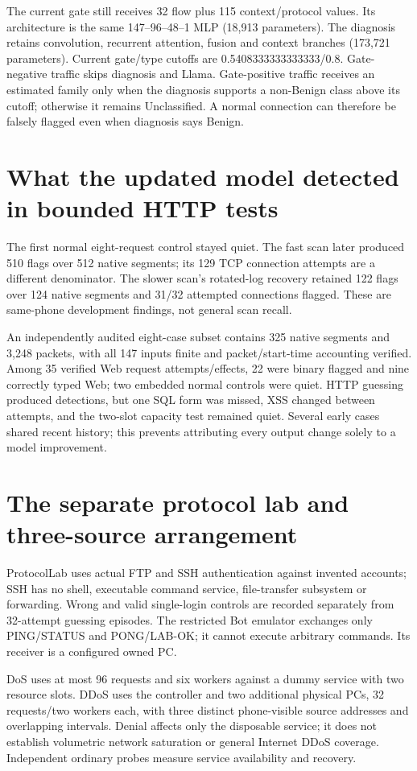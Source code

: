 \documentclass[11pt,a4paper,oneside]{report}
\begin{document}
The current gate still receives 32 flow plus 115 context/protocol values. Its architecture is the same 147--96--48--1 MLP (18,913 parameters). The diagnosis retains convolution, recurrent attention, fusion and context branches (173,721 parameters). Current gate/type cutoffs are 0.5408333333333333/0.8. Gate-negative traffic skips diagnosis and Llama. Gate-positive traffic receives an estimated family only when the diagnosis supports a non-Benign class above its cutoff; otherwise it remains Unclassified. A normal connection can therefore be falsely flagged even when diagnosis says Benign.

\section{What the updated model detected in bounded HTTP tests}
The first normal eight-request control stayed quiet. The fast scan later produced 510 flags over 512 native segments; its 129 TCP connection attempts are a different denominator. The slower scan's rotated-log recovery retained 122 flags over 124 native segments and 31/32 attempted connections flagged. These are same-phone development findings, not general scan recall.

An independently audited eight-case subset contains 325 native segments and 3,248 packets, with all 147 inputs finite and packet/start-time accounting verified. Among 35 verified Web request attempts/effects, 22 were binary flagged and nine correctly typed Web; two embedded normal controls were quiet. HTTP guessing produced detections, but one SQL form was missed, XSS changed between attempts, and the two-slot capacity test remained quiet. Several early cases shared recent history; this prevents attributing every output change solely to a model improvement.

\section{The separate protocol lab and three-source arrangement}
ProtocolLab uses actual FTP and SSH authentication against invented accounts; SSH has no shell, executable command service, file-transfer subsystem or forwarding. Wrong and valid single-login controls are recorded separately from 32-attempt guessing episodes. The restricted Bot emulator exchanges only PING/STATUS and PONG/LAB-OK; it cannot execute arbitrary commands. Its receiver is a configured owned PC.

DoS uses at most 96 requests and six workers against a dummy service with two resource slots. DDoS uses the controller and two additional physical PCs, 32 requests/two workers each, with three distinct phone-visible source addresses and overlapping intervals. Denial affects only the disposable service; it does not establish volumetric network saturation or general Internet DDoS coverage. Independent ordinary probes measure service availability and recovery.
\end{document}
